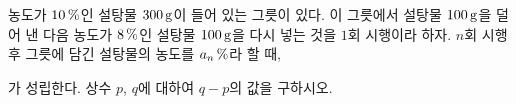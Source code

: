 농도가 $10\mkern3mu \%$인 설탕물 $300\mkern3mu \mathrm{g}$이 들어 있는 그릇이 있다. 이 그릇에서 설탕물 $100\mkern3mu \mathrm{g}$을 덜어 낸 다음 농도가 $8\mkern3mu \%$인 설탕물 $100\mkern3mu \mathrm{g}$을 다시 넣는 것을 $1$회 시행이라 하자. $n$회 시행 후 그릇에 담긴 설탕물의 농도를 $a_n\mkern3mu \%$라 할 때,\par\smallskip{}\par\smallskip\noindent 가 성립한다. 상수 $p$, $q$에 대하여 $q-p$의 값을 구하시오.
